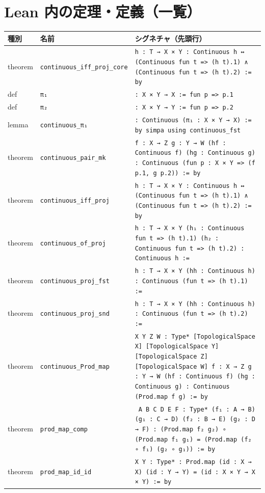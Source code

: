 \documentclass[11pt]{article}
\theoremstyle{definition}
\begin{document}
\section*{Lean 内の定理・定義（一覧）}
\begin{center}
\begin{tabular}{lll}
\textbf{種別} & \textbf{名前} & \textbf{シグネチャ（先頭行）} \\\hline
theorem & \texttt{continuous\_iff\_proj\_core} & \texttt{{h : T → X × Y} : Continuous h ↔ (Continuous fun t => (h t).1) ∧ (Continuous fun t => (h t).2) := by} \\
def & \texttt{π₁} & \texttt{: X × Y → X := fun p => p.1} \\
def & \texttt{π₂} & \texttt{: X × Y → Y := fun p => p.2} \\
lemma & \texttt{continuous\_π₁} & \texttt{: Continuous (π₁ : X × Y → X) := by simpa using continuous\_fst} \\
theorem & \texttt{continuous\_pair\_mk} & \texttt{{f : X → Z} {g : Y → W} (hf : Continuous f) (hg : Continuous g) : Continuous (fun p : X × Y => (f p.1, g p.2)) := by} \\
theorem & \texttt{continuous\_iff\_proj} & \texttt{{h : T → X × Y} : Continuous h ↔ (Continuous fun t => (h t).1) ∧ (Continuous fun t => (h t).2) := by} \\
theorem & \texttt{continuous\_of\_proj} & \texttt{{h : T → X × Y} (h₁ : Continuous fun t => (h t).1) (h₂ : Continuous fun t => (h t).2) : Continuous h :=} \\
theorem & \texttt{continuous\_proj\_fst} & \texttt{{h : T → X × Y} (hh : Continuous h) : Continuous (fun t => (h t).1) :=} \\
theorem & \texttt{continuous\_proj\_snd} & \texttt{{h : T → X × Y} (hh : Continuous h) : Continuous (fun t => (h t).2) :=} \\
theorem & \texttt{continuous\_Prod\_map} & \texttt{{X Y Z W : Type*} [TopologicalSpace X] [TopologicalSpace Y] [TopologicalSpace Z] [TopologicalSpace W] {f : X → Z} {g : Y → W} (hf : Continuous f) (hg : Continuous g) : Continuous (Prod.map f g) := by} \\
theorem & \texttt{prod\_map\_comp} & \texttt{ {A B C D E F : Type*} (f₁ : A → B) (g₁ : C → D) (f₂ : B → E) (g₂ : D → F) : (Prod.map f₂ g₂) ∘ (Prod.map f₁ g₁) = (Prod.map (f₂ ∘ f₁) (g₂ ∘ g₁)) := by} \\
theorem & \texttt{prod\_map\_id\_id} & \texttt{{X Y : Type*} : Prod.map (id : X → X) (id : Y → Y) = (id : X × Y → X × Y) := by} \\

\end{tabular}
\end{center}
\end{document}
